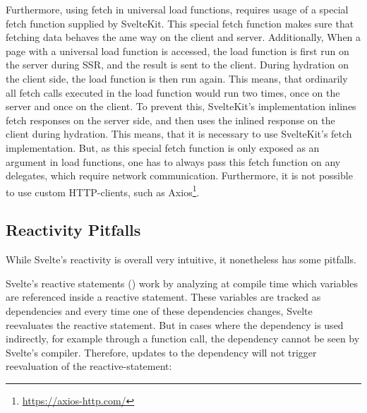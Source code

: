 
Furthermore, using fetch in universal load functions, requires usage of a special fetch function supplied by SvelteKit. This special fetch function makes sure that fetching data behaves the ame way on the client and server. Additionally, When a page with a universal load function is accessed, the load function is first run on the server during SSR, and the result is sent to the client. During hydration on the client side, the load function is then run again. This means, that ordinarily all fetch calls executed in the load function would run two times, once on the server and once on the client. To prevent this, SvelteKit's implementation inlines fetch responses on the server side, and then uses the inlined response on the client during hydration. This means, that it is necessary to use SvelteKit's fetch implementation. But, as this special fetch function is only exposed as an argument in load functions, one has to always pass this fetch function on any delegates, which require network communication. Furthermore, it is not possible to use custom HTTP-clients, such as Axios\footnote{\url{https://axios-http.com/}}.



\subsection{Reactivity Pitfalls}
\label{sec:evaluation-reactivity pitfalls}
While Svelte's reactivity is overall very intuitive, it nonetheless has some pitfalls.

Svelte's reactive statements () work by analyzing at compile time which variables are referenced inside a reactive statement. These variables are tracked as dependencies and every time one of these dependencies changes, Svelte reevaluates the reactive statement. But in cases where the dependency is used indirectly, for example through a function call, the dependency cannot be seen by Svelte's compiler. Therefore, updates to the dependency will not trigger reevaluation of the reactive-statement:

